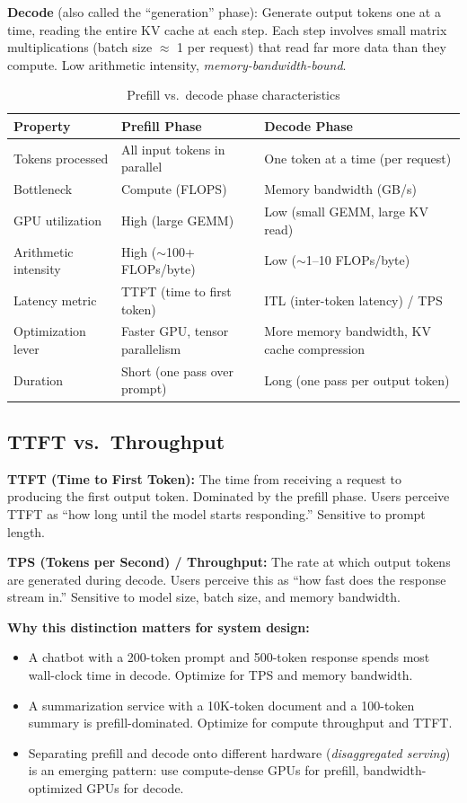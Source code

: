 \textbf{Decode} (also called the ``generation'' phase): Generate output tokens one at a time, reading the entire KV cache at each step. Each step involves small matrix multiplications (batch size $\approx$ 1 per request) that read far more data than they compute. Low arithmetic intensity, \textit{memory-bandwidth-bound}.

\begin{table}[H]
\centering
\caption{Prefill vs.\ decode phase characteristics}
\begin{tabularx}{\textwidth}{lXX}
\toprule
\textbf{Property} & \textbf{Prefill Phase} & \textbf{Decode Phase} \\
\midrule
Tokens processed & All input tokens in parallel & One token at a time (per request) \\
Bottleneck & Compute (FLOPS) & Memory bandwidth (GB/s) \\
GPU utilization & High (large GEMM) & Low (small GEMM, large KV read) \\
Arithmetic intensity & High ($\sim$100+ FLOPs/byte) & Low ($\sim$1--10 FLOPs/byte) \\
Latency metric & TTFT (time to first token) & ITL (inter-token latency) / TPS \\
Optimization lever & Faster GPU, tensor parallelism & More memory bandwidth, KV cache compression \\
Duration & Short (one pass over prompt) & Long (one pass per output token) \\
\bottomrule
\end{tabularx}
\end{table}

\subsection{TTFT vs.\ Throughput}

\textbf{TTFT (Time to First Token):} The time from receiving a request to producing the first output token. Dominated by the prefill phase. Users perceive TTFT as ``how long until the model starts responding.'' Sensitive to prompt length.

\textbf{TPS (Tokens per Second) / Throughput:} The rate at which output tokens are generated during decode. Users perceive this as ``how fast does the response stream in.'' Sensitive to model size, batch size, and memory bandwidth.

\textbf{Why this distinction matters for system design:}
\begin{itemize}
    \item A chatbot with a 200-token prompt and 500-token response spends most wall-clock time in decode. Optimize for TPS and memory bandwidth.
    \item A summarization service with a 10K-token document and a 100-token summary is prefill-dominated. Optimize for compute throughput and TTFT.
    \item Separating prefill and decode onto different hardware (\textit{disaggregated serving}) is an emerging pattern: use compute-dense GPUs for prefill, bandwidth-optimized GPUs for decode.
\end{itemize}

